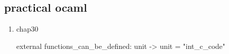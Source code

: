 \subsection{practical ocaml}
\label{sec:practical-ocaml}


\begin{enumerate}
\item chap30 \\

  \begin{bluetext}
external functions_can_be_defined: unit -> unit = "int_c_code"     
  \end{bluetext}
\end{enumerate}

